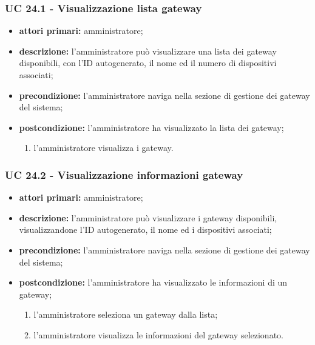 			\subsubsection{UC 24.1 - Visualizzazione lista gateway}
			\begin{itemize}
				\item \textbf{attori primari:} amministratore;
				\item \textbf{descrizione:} l'amministratore può visualizzare una lista dei gateway disponibili, con l'ID autogenerato, il nome ed il numero di dispositivi associati;
				\item \textbf{precondizione:} l'amministratore naviga nella sezione di gestione dei gateway del sistema;
				\item \textbf{postcondizione:} l'amministratore ha visualizzato la lista dei gateway;
				\begin{enumerate}
					\item{l'amministratore visualizza i gateway.}
				\end{enumerate} 
			\end{itemize}

			\subsubsection{UC 24.2 - Visualizzazione informazioni gateway}
			\begin{itemize}
				\item \textbf{attori primari:} amministratore;
				\item \textbf{descrizione:} l'amministratore può visualizzare i gateway disponibili, visualizzandone l'ID autogenerato, il nome ed i dispositivi associati;
				\item \textbf{precondizione:} l'amministratore naviga nella sezione di gestione dei gateway del sistema;
				\item \textbf{postcondizione:} l'amministratore ha visualizzato le informazioni di un gateway;
				\begin{enumerate}
					\item l'amministratore seleziona un gateway dalla lista;
					\item l'amministratore visualizza le informazioni del gateway selezionato.
				\end{enumerate} 
			\end{itemize}

